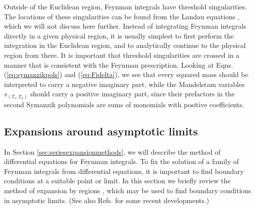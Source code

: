 \documentclass{article}
\begin{document}
Outside of the Euclidean region, Feynman integrals have threshold singularities. The locations of these singularities can be found from the Landau equations \cite{Landau:1959fi}, which we will not discuss here further. Instead of integrating Feynman integrals directly in a given physical region, it is usually simplest to first perform the integration in the Euclidean region, and to analytically continue to the physical region from there. It is important that threshold singularities are crossed in a manner that is consistent with the Feynman prescription. Looking at Eqns. (\ref{eq:symanzikpols}) and (\ref{eq:Fidelta}), we see that every squared mass should be interpreted to carry a negative imaginary part, while the Mandelstam variables $s_{(T_1,T_2)}$ should carry a positive imaginary part, since their prefactors in the second Symanzik polynomials are sums of monomials with positive coefficients.

\subsection{Expansions around asymptotic limits}
\label{sec:expansionbyregions}
In Section \ref{sec:seriesexpansionmethods}, we will describe the method of differential equations for Feynman integrals. To fix the solution of a family of Feynman integrals from differential equations, it is important to find boundary conditions at a suitable point or limit. In this section we briefly review the method of expansion by regions \cite{Beneke:1997zp, Smirnov:1999bza, Jantzen:2011nz}, which may be used to find boundary conditions in asymptotic limits. (See also Refs. \cite{Semenova:2018cwy, Ananthanarayan:2018tog, Ananthanarayan:2020ptw} for some recent developments.) 
\end{document}
